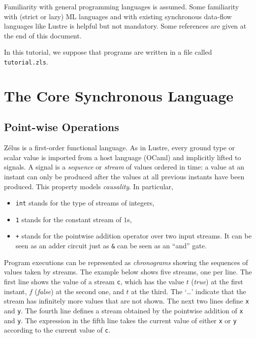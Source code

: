 \documentclass[11pt,titlepage,twoside]{report}
\newcommand{\zls}[1]{\texttt{#1}}
\newcommand{\f}{$f$}
\renewcommand{\t}{$t$}
\newcommand{\zelus}{{\sf Z\'elus}}
\newcommand{\lustre}{{\sf Lustre}}
\newcommand{\ocaml}{{\sf OCaml}}
\begin{document}
Familiarity with general programming languages is assumed.
Some familiarity with (strict or lazy) ML
languages and with existing synchronous data-flow languages like \lustre{} is
helpful but not mandatory. Some references are given at the end of this document.

In this tutorial, we suppose that programs are written in a file called
\verb-tutorial.zls-.%

\section{The Core Synchronous Language\label{coresync}} %

\subsection{Point-wise Operations\label{pointwise}} %

\zelus{} is a first-order functional language. As in \lustre,
every ground type or scalar value is imported from a host language
(\ocaml{}) and implicitly lifted to signals. A signal is a
\emph{sequence} or \emph{stream} of values ordered in time:
a value at an instant can only be produced after the values at all previous 
instants have been produced. This property
models \emph{causality}. In particular,
\begin{itemize}
\item \verb-int- stands for the type of streams of integers,
\item \verb-1- stands for the constant stream of $1$s,
\item \verb-+- stands for the pointwise addition operator over two input 
streams. It can be seen as an adder circuit just as \verb-&- can be seen as an
  ``and'' gate.
\end{itemize}
Program executions can be represented as \emph{chronograms} showing the 
sequences of values taken by streams. The
example below shows five streams, one per line. The first line shows
the value of a stream \zls{c}, which has the value \t{} ({\em true}) at the 
first instant, \f{} ({\em false}) at the second one, and \t{} at the
third. The `\dots' indicate that the stream has infinitely more values that 
are not shown. The next two lines define \zls{x} and \zls{y}. The fourth 
line defines a stream obtained
by the pointwise addition of \zls{x} and \zls{y}.
The expression in the fifth line takes the current value of either \zls{x} 
or \zls{y} according to the current value of \zls{c}.
\end{document}
